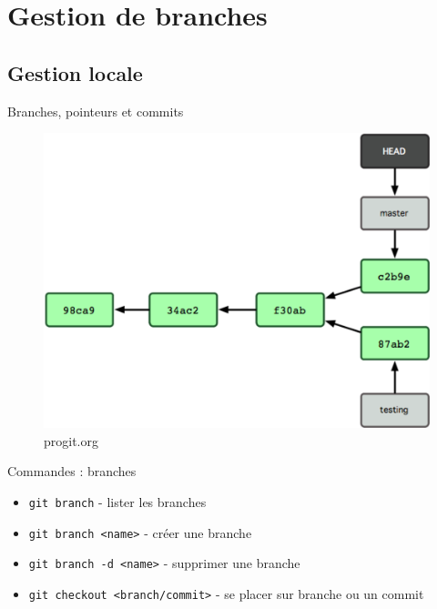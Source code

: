 \documentclass{beamer}
\begin{document}
\section{Gestion de branches}
\subsection*{Gestion locale}
\begin{frame}{Branches, pointeurs et commits}
  \begin{figure}
    \begin{center}
      \includegraphics[scale=0.8]{img/Branch1.png}
    \end{center}
    \caption{progit.org}
  \end{figure}
\end{frame}

\begin{frame}[containsverbatim]{Commandes : branches}
  \begin{itemize}
  \item \lstinline|git branch| - lister les branches
  \item \lstinline|git branch <name>| - créer une branche
  \item \lstinline|git branch -d <name>| - supprimer une branche
  \item \lstinline|git checkout <branch/commit>| - se placer sur branche ou un commit
  \end{itemize}
\end{frame}
\end{document}
